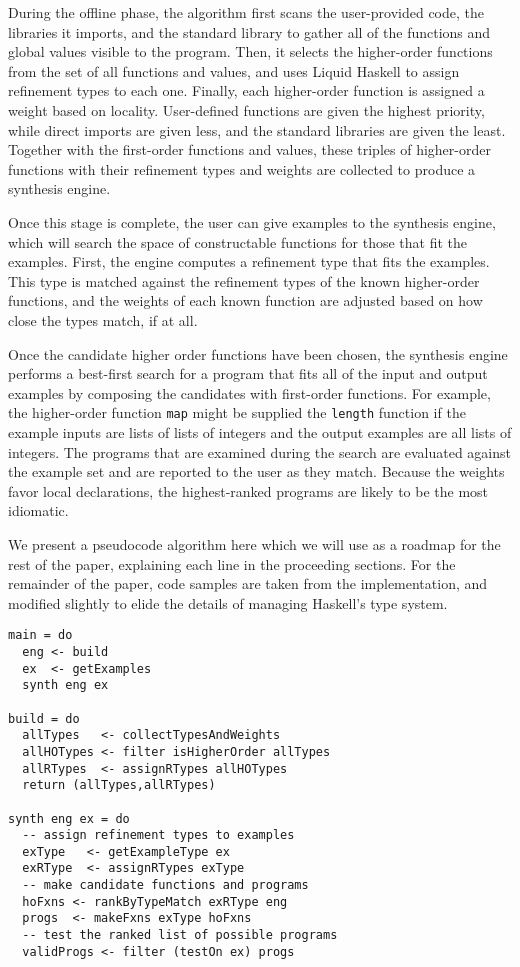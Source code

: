 During the offline phase, the algorithm first scans the user-provided code, the libraries it imports, and the standard library to gather all of the functions and global values visible to the program. Then, it selects the higher-order functions from the set of all functions and values, and uses Liquid Haskell \cite{DBLP:conf/haskell/VazouSJ14, DBLP:conf/esop/VazouRJ13, DBLP:conf/icfp/VazouSJVJ14} to assign refinement types to each one. Finally, each higher-order function is assigned a weight based on locality\cite{DBLP:conf/pldi/GveroKKP13}. User-defined functions are given the highest priority, while direct imports are given less, and the standard libraries are given the least. Together with the first-order functions and values, these triples of higher-order functions with their refinement types and weights are collected to produce a synthesis engine.

Once this stage is complete, the user can  give examples to the synthesis engine, which will search the space of constructable functions for those that fit the examples. First, the engine computes a refinement type that fits the examples. This type is matched against the refinement types of the known higher-order functions, and the weights of each known function are adjusted based on how close the types match, if at all.

Once the candidate higher order functions have been chosen, the synthesis engine performs a best-first search for a program that fits all of the input and output examples by composing the candidates with first-order functions. For example, the higher-order function \texttt{map} might be supplied the \texttt{length} function if the example inputs are lists of lists of integers and the output examples are all lists of integers. The programs that are examined during the search are evaluated against the example set and are reported to the user as they match. Because the weights favor local declarations, the highest-ranked programs are likely to be the most idiomatic.

We present a pseudocode algorithm here which we will use as a roadmap for the rest of the paper, explaining each line in the proceeding sections. For the remainder of the paper, code samples are taken from the implementation, and modified slightly to elide the details of managing Haskell's type system.

\begin{lstlisting}[caption=A pseudocode representation of the build and synthesis stages of the synthesis algorithm, label=listing:Algo]
main = do
  eng <- build
  ex  <- getExamples
  synth eng ex

build = do
  allTypes   <- collectTypesAndWeights
  allHOTypes <- filter isHigherOrder allTypes
  allRTypes  <- assignRTypes allHOTypes
  return (allTypes,allRTypes)

synth eng ex = do
  -- assign refinement types to examples
  exType   <- getExampleType ex
  exRType  <- assignRTypes exType
  -- make candidate functions and programs
  hoFxns <- rankByTypeMatch exRType eng
  progs  <- makeFxns exType hoFxns
  -- test the ranked list of possible programs
  validProgs <- filter (testOn ex) progs
\end{lstlisting}
